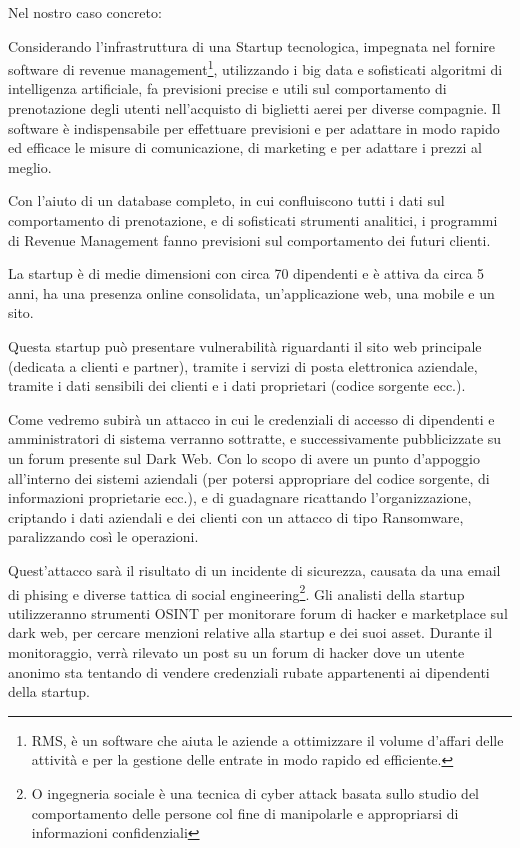 Nel nostro caso concreto:

Considerando l'infrastruttura di una Startup tecnologica, impegnata nel fornire software di revenue management\footnote{RMS, è un software che aiuta le aziende a ottimizzare il volume d'affari delle attività e per la gestione delle entrate in modo rapido ed efficiente.}, utilizzando i big data e sofisticati algoritmi di intelligenza artificiale, fa previsioni precise e utili sul comportamento di prenotazione degli utenti nell'acquisto di biglietti aerei per diverse compagnie. Il software è indispensabile per effettuare previsioni e per adattare in modo rapido ed efficace le misure di comunicazione, di marketing e per adattare i prezzi al meglio.

 Con l’aiuto di un database completo, in cui confluiscono tutti i dati sul comportamento di prenotazione, e di sofisticati strumenti analitici, i programmi di Revenue Management fanno previsioni sul comportamento dei futuri clienti.

 La startup è di medie dimensioni con circa 70 dipendenti e è attiva da circa 5 anni, ha una presenza online consolidata, un'applicazione web, una mobile e un sito. 

 Questa startup può presentare vulnerabilità riguardanti il sito web principale (dedicata a clienti e partner), tramite i servizi di posta elettronica aziendale, tramite i dati sensibili dei clienti e i dati proprietari (codice sorgente ecc.).

 Come vedremo subirà un attacco in cui le credenziali di accesso di dipendenti e amministratori di sistema verranno sottratte, e successivamente pubblicizzate su un forum presente sul Dark Web. Con lo scopo di avere un punto d'appoggio all'interno dei sistemi aziendali (per potersi appropriare del codice sorgente, di informazioni proprietarie ecc.), e di guadagnare ricattando l'organizzazione, criptando i dati aziendali e dei clienti con un attacco di tipo Ransomware, paralizzando così le operazioni.

 Quest'attacco sarà il risultato di un incidente di sicurezza, causata da una email di phising e diverse tattica di social engineering\footnote{O ingegneria sociale è una tecnica di cyber attack basata sullo studio del comportamento delle persone col fine di manipolarle e appropriarsi di informazioni confidenziali}. Gli analisti della startup utilizzeranno strumenti OSINT per monitorare forum di hacker e marketplace sul dark web, per cercare menzioni relative alla startup e dei suoi asset.
Durante il monitoraggio, verrà rilevato un post su un forum di hacker dove un utente anonimo sta tentando di vendere credenziali rubate appartenenti ai dipendenti della startup.


